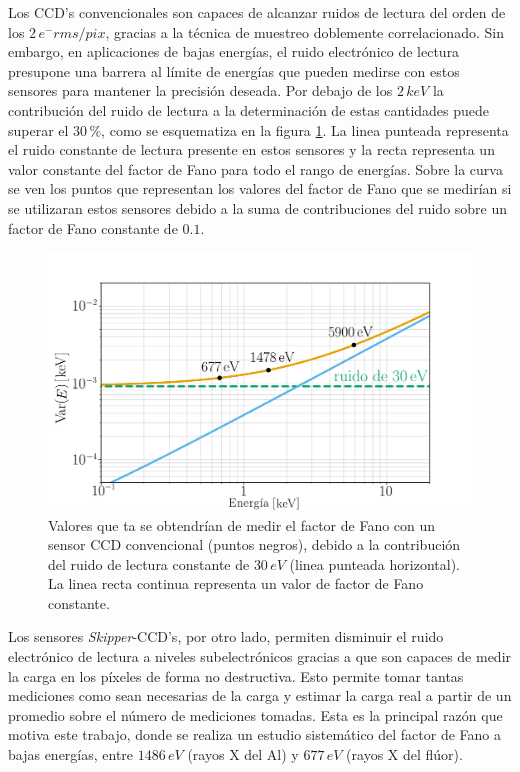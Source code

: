 Los CCD's convencionales son capaces de alcanzar ruidos de lectura del orden de los $2\,e^{-}\si{rms/pix}$, gracias a la técnica de muestreo doblemente correlacionado\cite{Tiffenberg}. Sin embargo, en aplicaciones de bajas energías, el ruido electrónico de lectura presupone una barrera al límite de energías que pueden medirse con estos sensores para mantener la precisión deseada. Por debajo de los $2\,\si{keV}$ la contribución del ruido de lectura a la determinación de estas cantidades puede superar el $30\,\%$, como se esquematiza en la figura \ref{fig:Fano_y_ruido}. La linea punteada representa el ruido constante de lectura presente en estos sensores y la recta representa un valor constante del factor de Fano para todo el rango de energías. Sobre la curva se ven los puntos que representan los valores del factor de Fano que se medirían si se utilizaran estos sensores debido a la suma de contribuciones del ruido sobre un factor de Fano constante de $0.1$.
\begin{figure}[H]
    \centering
        \includegraphics[scale=0.5]{Figs/fano_y_ruido.pdf}
    \caption{\footnotesize{Valores que ta se obtendrían de medir el factor de Fano con un sensor CCD convencional (puntos negros), debido a la contribución del ruido de lectura constante de $30\,\si{eV}$ (linea punteada horizontal). La linea recta continua representa un valor de factor de Fano constante.}}
    \label{fig:Fano_y_ruido}
\end{figure}
Los sensores \textit{Skipper}-CCD's, por otro lado, permiten disminuir el ruido electrónico de lectura a niveles subelectrónicos gracias a que son capaces de medir la carga en los píxeles de forma no destructiva. Esto permite tomar tantas mediciones como sean necesarias de la carga y estimar la carga real a partir de un promedio sobre el número de mediciones tomadas. Esta es la principal razón que motiva este trabajo, donde se realiza un estudio sistemático del factor de Fano a bajas energías, entre $1486\,\si{eV}$ (rayos X del Al) y $677\,\si{eV}$ (rayos X del flúor).
